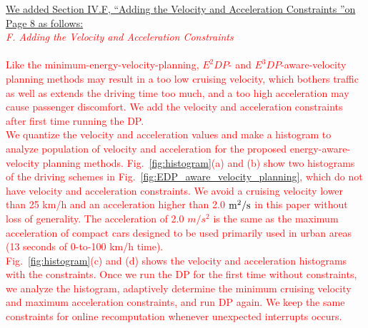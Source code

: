 \documentclass[onecolumn]{IEEEconf}
\begin{document}
\begin{description}


\uline{We added Section IV.F, ``Adding the Velocity and Acceleration Constraints ''on Page 8 as follows:}\\

\textcolor{red}{\it F. Adding the Velocity and Acceleration Constraints}\\ \\
\textcolor{red}{Like the minimum-energy-velocity-planning, $E^2DP$- and $E^3DP$-aware-velocity planning methods may result in a too low cruising velocity, which bothers traffic as well as extends the driving time too much, and a too high acceleration may cause passenger discomfort. We add the velocity and acceleration constraints after first time running the DP. \\
We quantize the velocity and acceleration values and make a histogram to analyze population of velocity and acceleration for the proposed energy-aware-velocity planning methods. Fig.~\ref{fig:histogram}(a) and (b) show two histograms of the driving schemes in Fig.~\ref{fig:EDP_aware_velocity_planning}, which do not have velocity and acceleration constraints. We avoid a cruising velocity lower than 25 km/h and an acceleration higher than 2.0 $\rm{m^2}/s$ in this paper without loss of generality. The  acceleration of 2.0 $m/s^2$ is the same as the maximum acceleration of compact cars designed to be used primarily used in urban areas (13 seconds of 0-to-100 km/h time).\\
Fig.~\ref{fig:histogram}(c) and (d) shows the velocity and acceleration histograms with the constraints. Once we run the DP for the first time without constraints, we analyze the histogram, adaptively determine the minimum cruising velocity and maximum acceleration constraints, and run DP again. We keep the same constraints for online recomputation whenever unexpected interrupts occurs.} 


\end{description}
\end{document}
